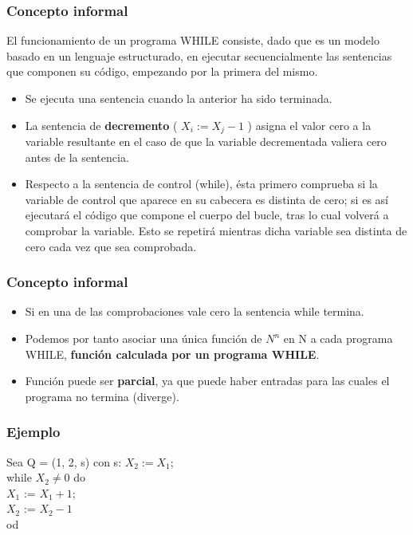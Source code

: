 \documentclass[xcolor=table]{beamer}
\begin{document}
\begin{frame}[fragile]\frametitle{Concepto informal} \small  

El funcionamiento de un programa WHILE consiste, dado que es un modelo basado en un lenguaje estructurado, en ejecutar secuencialmente las sentencias que componen su código, empezando por la primera del mismo.

\begin{itemize}
    \item Se ejecuta una sentencia cuando la anterior ha sido terminada.
    \item La sentencia de \textbf{decremento} ( $X_i := X_j - 1$ ) asigna el valor cero a la variable resultante en el caso de que la variable decrementada valiera cero antes de la sentencia.
    
    \item  Respecto a la sentencia de control (while), ésta primero comprueba si la variable de control que aparece en su cabecera es distinta de cero; si es así ejecutará el código que compone el cuerpo del bucle, tras lo cual volverá a comprobar la variable. Esto se repetirá mientras dicha variable sea distinta de cero cada vez que sea comprobada.

\end{itemize}

\end{frame}

\begin{frame}[fragile]\frametitle{Concepto informal} \small  


\begin{itemize}

    \item Si en una de las comprobaciones vale cero la sentencia while termina.
    \item Podemos por tanto asociar una única función de $N^n$ en N a cada programa WHILE, \textbf{función calculada por un programa WHILE}.
    \item Función puede ser \textbf{parcial}, ya que puede haber entradas para las cuales el programa no termina (diverge).
\end{itemize}

\end{frame}

\begin{frame}[fragile]\frametitle{Ejemplo} \small  

\begin{block}{}

Sea Q = (1, 2, s) con s: \hfill \break
$X_2 := X_1$;\\
while $X_2 \neq 0$ do\\
\hspace{0.5cm}$X_1$ := $X_1 + 1$;\\
\hspace{0.5cm}$X_2$ := $X_2 - 1$\\
od
\end{block}

\end{frame}
\end{document}
